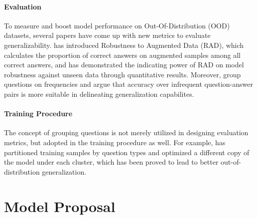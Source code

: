 \documentclass[11pt,a4paper]{article}
\begin{document}
\paragraph{Evaluation}
To measure and boost model performance on Out-Of-Distribution (OOD) datasets, several papers have come up with new metrics to evaluate generalizability. \citet{RAD} has introduced Robustness to Augmented Data (RAD), which calculates the proportion of correct answers on augmented samples among all correct answers, and has demonstrated the indicating power of RAD on model robustness against unseen data through quantitative results. 
Moreover, \citet{Roses} group questions on frequencies and argue that accuracy over infrequent question-answer pairs is more suitable in delineating generalization capabilites.   
 
\paragraph{Training Procedure}
The concept of grouping questions is not merely utilized in designing evaluation metrics, but adopted in the training procedure as well. For example,  \citet{mutant} has partitioned training samples by question types and optimized a different copy of the model under each cluster, which has been proved to lead to better out-of-distribution generalization. 

\section{Model Proposal}
\end{document}
